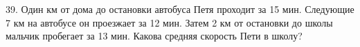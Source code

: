39. Один км от дома до остановки автобуса Петя проходит за 15 мин. Следующие 7 км на автобусе он проезжает за 12 мин. Затем 2 км от остановки до школы мальчик пробегает за 13 мин. Какова средняя скорость Пети в школу?\\
